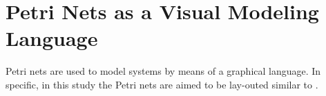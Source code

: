 \section{Petri Nets as a Visual Modeling Language}

Petri nets are used to model systems by means of a graphical language\parencites(cf.)(){reisig2013understanding}.
In specific, in this study the Petri nets are aimed to be lay-outed similar to  \cite{reisig2013understanding}.


